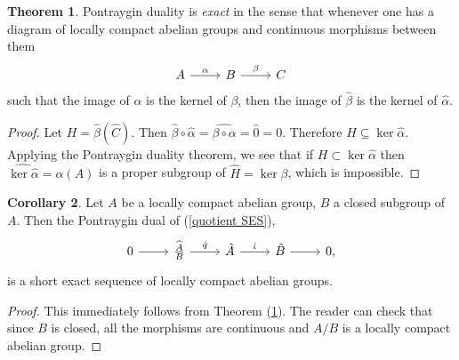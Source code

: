 \documentclass[12pt]{book}
\newcommand{\dfn}[1]{\emph{#1}\index{#1}}
\theoremstyle{definition}
\newtheorem{theorem}{Theorem}[section]
\newtheorem{corollary}[theorem]{Corollary}
\begin{document}
\begin{theorem}
\label{duality is exact}
Pontraygin duality is \dfn{exact} in the sense that whenever one has a diagram of locally compact abelian groups and continuous morphisms between them
$$\begin{tikzcd}
A \arrow[r,"\alpha"] & B \arrow[r, "\beta"] & C
\end{tikzcd}
$$
such that the image of $\alpha$ is the kernel of $\beta$, then the image of $\hat \beta$ is the kernel of $\hat \alpha$.
\end{theorem}
\begin{proof}
Let $H = \hat \beta(\hat C)$. Then $\hat \beta \circ \hat \alpha = \widehat{\beta \circ \alpha} = \hat 0 = 0$. Therefore $H \subseteq \ker \hat \alpha$.
Applying the Pontraygin duality theorem, we see that if $H \subset \ker \hat \alpha$ then $\widehat{\ker \hat \alpha} = \alpha(A)$ is a proper subgroup of $\hat H = \ker \beta$, which is impossible.
\end{proof}

\begin{corollary}
\label{duality is exact 2}
Let $A$ be a locally compact abelian group, $B$ a closed subgroup of $A$.
Then the Pontraygin dual of (\ref{quotient SES}),
$$
\begin{tikzcd}
0 \arrow[r] & \widehat{\frac{A}{B}} \arrow[r,"\hat q"] & \hat A \arrow[r,"\hat \iota"] & \hat B \arrow[r] & 0,
\end{tikzcd}$$
is a short exact sequence of locally compact abelian groups.
\end{corollary}
\begin{proof}
This immediately follows from Theorem (\ref{duality is exact}).
The reader can check that since $B$ is closed, all the morphisms are continuous and $A/B$ is a locally compact abelian group.
\end{proof}
\end{document}
